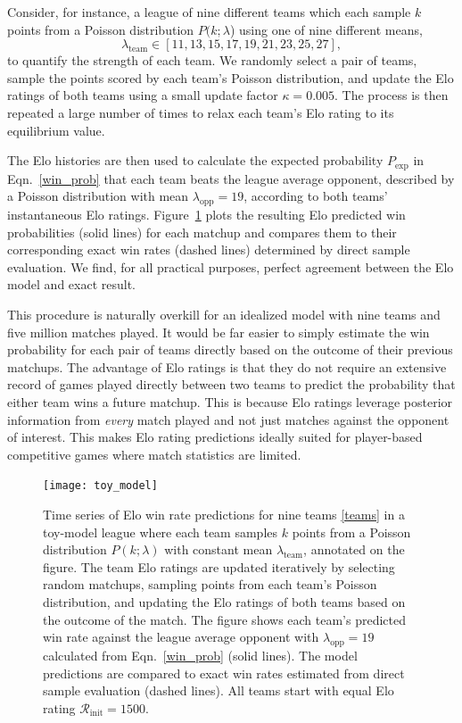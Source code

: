 \documentclass[aps,prc,reprint,amsmath,superscriptaddress,nofootinbib]{revtex4-1}
\newcommand{\R}{\mathcal{R}}
\begin{document}
Consider, for instance, a league of nine different teams which each sample $k$ points from a Poisson distribution $P(k; \lambda$) using one of nine different means,
\begin{equation}
  \label{teams}
  \lambda_\text{team} \in [11, 13, 15, 17, 19, 21, 23, 25, 27],
\end{equation}
to quantify the strength of each team.
We randomly select a pair of teams, sample the points scored by each team's Poisson distribution, and update the Elo ratings of both teams using a small update factor $\kappa = 0.005$.
The process is then repeated a large number of times to relax each team's Elo rating to its equilibrium value.

The Elo histories are then used to calculate the expected probability $P_\text{exp}$ in Eqn.~\eqref{win_prob} that each team beats the league average opponent, described by a Poisson distribution with mean $\lambda_\text{opp}=19$, according to both teams' instantaneous Elo ratings.
Figure~\ref{fig:toy_model} plots the resulting Elo predicted win probabilities (solid lines) for each matchup and compares them to their corresponding exact win rates (dashed lines) determined by direct sample evaluation.
We find, for all practical purposes, perfect agreement between the Elo model and exact result.

This procedure is naturally overkill for an idealized model with nine teams and five million matches played. It would be far easier to simply estimate the win probability for each pair of teams directly based on the outcome of their previous matchups.
The advantage of Elo ratings is that they do not require an extensive record of games played directly between two teams to predict the probability that either team wins a future matchup. This is because Elo ratings leverage posterior information from \emph{every} match played and not just matches against the opponent of interest.
This makes Elo rating predictions ideally suited for player-based competitive games where match statistics are limited.

\begin{figure}
  \texttt{[image: toy\_model]}
  \caption{\label{fig:toy_model} Time series of Elo win rate predictions for nine teams \eqref{teams} in a toy-model league where each team samples $k$ points from a Poisson distribution $P(k; \lambda)$ with constant mean $\lambda_\text{team}$, annotated on the figure. The team Elo ratings are updated iteratively by selecting random matchups, sampling points from each team's Poisson distribution, and updating the Elo ratings of both teams based on the outcome of the match. The figure shows each team's predicted win rate against the league average opponent with $\lambda_\text{opp} = 19$ calculated from Eqn.~\eqref{win_prob} (solid lines). The model predictions are compared to exact win rates estimated from direct sample evaluation (dashed lines). All teams start with equal Elo rating ${\R_\text{init} = 1500}$.
  }
\end{figure}
\end{document}
